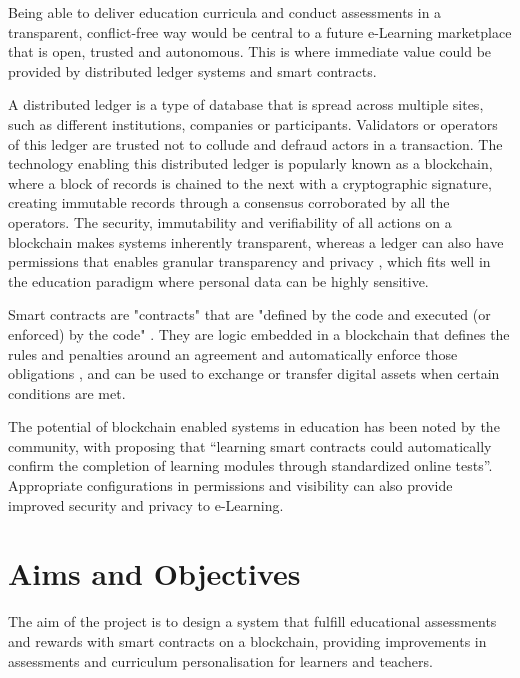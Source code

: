 Being able to deliver education curricula and conduct assessments in a transparent, conflict-free way would be central to 
a future e-Learning marketplace that is open, trusted and autonomous.
This is where immediate value could be provided by distributed ledger systems and smart contracts.

A distributed ledger is a type of database that is spread across multiple sites, such as different institutions, companies 
or participants. Validators or operators of this ledger are trusted not to collude and defraud actors in a transaction. 
The technology enabling this distributed ledger is popularly known as a blockchain, where a block of records is chained to 
the next with a cryptographic signature, creating immutable records through a consensus corroborated by all the operators. 
\citep[p.17]{walport2016distributed}
The security, immutability and verifiability of all actions on a blockchain makes systems inherently transparent, whereas 
a ledger can also have permissions that enables granular transparency and privacy \citep[p.22]{walport2016distributed}, 
which fits well in the education paradigm where personal data can be highly sensitive.

Smart contracts are "contracts" that are "defined by the code and executed (or enforced) by the code" \citep[p.16]{swan2015blockchain}.
They are logic embedded in a blockchain that defines the rules and penalties around an agreement and automatically enforce 
those obligations \citep{gulhane2017ibm}, and can be used to exchange or transfer digital assets when certain conditions are met. 

The potential of blockchain enabled systems in education has been noted by the community, with \citet[p.62]{swan2015blockchain} 
proposing that “learning smart contracts could automatically confirm the completion of learning modules through standardized 
online tests”. Appropriate configurations in permissions and visibility can also provide improved security and privacy to e-Learning.

\section{Aims and Objectives} %

The aim of the project is to design a system that fulfill educational assessments and rewards with 
smart contracts on a blockchain, providing improvements in assessments and curriculum personalisation 
for learners and teachers.

